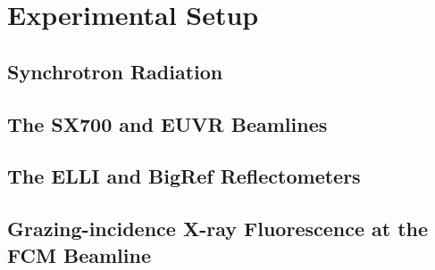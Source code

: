 \chapter{Experimental Setup}
\section{Synchrotron Radiation}
\section{The SX700 and EUVR Beamlines}
\section{The ELLI and BigRef Reflectometers}
\section{Grazing-incidence X-ray Fluorescence at the FCM Beamline}